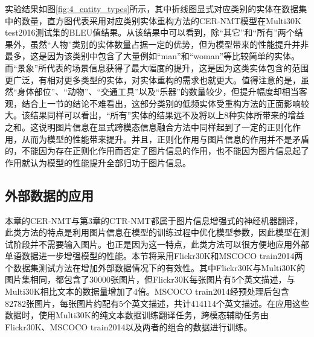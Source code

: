 
实验结果如图\ref{fig:4_entity_types}所示，其中折线图显式对应类别的实体在数据集中的数量，直方图代表采用对应类别实体重构方法的CER-NMT模型在Multi30K test2016测试集的BLEU值结果。从该结果中可以看到，除“其它”和“所有”两个结果外，虽然“人物”类别的实体数量占据一定的优势，但为模型带来的性能提升并非最多，这是因为该类别中包含了大量例如“man”和“woman”等比较简单的实体。而“景象”所代表的场景信息获得了最大幅度的提升，这是因为这类实体包含的范围更广泛，有相对更多类型的实体，对实体重构的需求也就更大。值得注意的是，虽然“身体部位”、“动物”、“交通工具”以及“乐器”的数量较少，但提升幅度却相当客观，结合上一节的结论不难看出，这部分类别的低频实体受重构方法的正面影响较大。该结果同样可以看出，“所有”实体的结果远不及将以上8种实体所带来的增益之和。这说明图片信息在显式跨模态信息融合方法中同样起到了一定的正则化作用\citep{wu2021good}，从而为模型的性能带来提升。并且，正则化作用与图片信息的作用并不是矛盾的，不能因为存在正则化作用而否定了图片信息的作用，也不能因为图片信息起了作用就认为模型的性能提升全部归功于图片信息。

\subsection{外部数据的应用}
\label{sec:4_external_data}


%

本章的CER-NMT与第3章的CTR-NMT都属于图片信息增强式的神经机器翻译，此类方法的特点是利用图片信息在模型的训练过程中优化模型参数，因此模型在测试阶段并不需要输入图片。也正是因为这一特点，此类方法可以很方便地应用外部单语数据进一步增强模型的性能。本节将采用Flickr30K和MSCOCO train2014两个数据集测试方法在增加外部数据情况下的有效性。其中Flickr30K与Multi30K的图片集相同，都包含了30000张图片，但Flickr30K每张图片有5个英文描述，与Multi30K相比文本的数据量增加了4倍。MSCOCO train2014经预处理后包含82782张图片，每张图片约配有5个英文描述，共计414114个英文描述。在应用这些数据时，使用Multi30K的纯文本数据训练翻译任务，跨模态辅助任务由Flickr30K、MSCOCO train2014以及两者的组合的数据进行训练。


